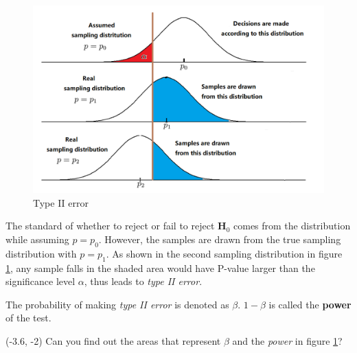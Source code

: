 \documentclass[a4paper, 12pt,twoside]{book}
\begin{document}
\begin{figure}[H]
\centering
\includegraphics[scale=0.6]{TypeTwoError}
\caption{Type II error}
\label{TypeTwoError}
\end{figure}

The standard of whether to reject or fail to reject $\textbf{H}_0$ comes from the distribution while assuming $p=p_0$. However, the samples are drawn from the true sampling distribution with $p=p_1$. As shown in the second sampling distribution in figure \ref{TypeTwoError}, any sample falls in the shaded area would have P-value larger than the significance level $\alpha$, thus leads to \textit{type II error}.\vspace{0.3cm}

 The probability of making \textit{type II error} is denoted as $\beta$. $1-\beta$ is called the \textbf{power} of the test.\vspace{0.3cm}

\begin{textblock}{3.2}(-3.6, -2)
Can you find out the areas that represent $\beta$ and the \textit{power} in figure \ref{TypeTwoError}?
\end{textblock}
\vspace{0.3cm}
\end{document}
